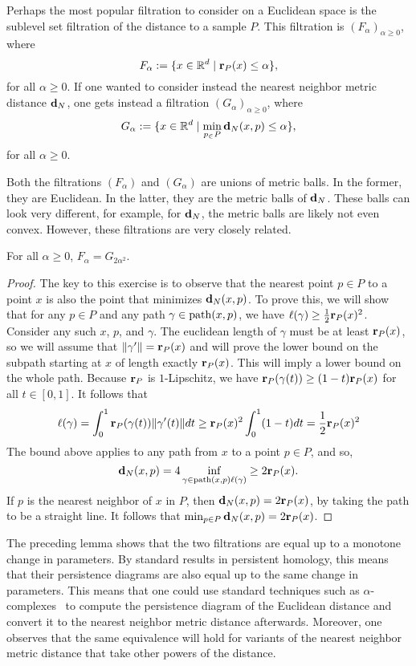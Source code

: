     Perhaps the most popular filtration to consider on a Euclidean space is the sublevel set filtration of the distance to a sample $P$.
    This filtration is $(F_\alpha)_{\alpha\ge 0}$, where
    \[
      F_\alpha := \{x\in \mathbb{R}^d \mid \mathbf{r}_P(x) \le \alpha\},
    \]
    for all $\alpha \ge 0$.
    If one wanted to consider instead the nearest neighbor metric distance $\mathbf{d}_N$, one gets instead a filtration $(G_\alpha)_{\alpha\ge 0}$, where
    \[
      G_\alpha := \{x\in \mathbb{R}^d \mid \min_{p_\in P} \mathbf{d}_N(x,p) \le \alpha\},
    \]
    for all $\alpha \ge 0$.

    Both the filtrations $(F_\alpha)$ and $(G_\alpha)$ are unions of metric balls.
    In the former, they are Euclidean.
    In the latter, they are the metric balls of $\mathbf{d}_N$.
    These balls can look very different, for example, for $\mathbf{d}_N$, the metric balls are likely not even convex.
    However, these filtrations are very closely related.
    \begin{lemma}
      For all $\alpha \ge 0$, $F_\alpha = G_{2\alpha^2}$.
    \end{lemma}
    \begin{proof}
      The key to this exercise is to observe that the nearest point $p \in P$ to a point $x$ is also the point that minimizes $\mathbf{d}_N(x,p)$.
      To prove this, we will show that for any $p\in P$ and any path $\gamma\in \mathrm{path}(x,p)$, we have $\ell(\gamma)\ge \frac{1}{2}\mathbf{r}_P(x)^2$.
      Consider any such $x$, $p$, and $\gamma$.
      The euclidean length of $\gamma$ must be at least $\mathbf{r}_P(x)$, so we will assume that $\|\gamma'\| = \mathbf{r}_P(x)$ and will prove the lower bound on the subpath starting at $x$ of length exactly $\mathbf{r}_P(x)$.
      This will imply a lower bound on the whole path.
      Because $\mathbf{r}_P$ is $1$-Lipschitz, we have $\mathbf{r}_P(\gamma(t))\ge (1-t)\mathbf{r}_P(x)$ for all $t\in [0,1]$.  It follows that
      \[
        \ell(\gamma) = \int_0^1 \mathbf{r}_P(\gamma(t))\|\gamma'(t)\|dt
          \ge \mathbf{r}_P(x)^2 \int_0^1 (1-t)dt
          =  \frac{1}{2}\mathbf{r}_P(x)^2
      \]
      The bound above applies to any path from $x$ to a point $p\in P$, and so,
      \[
        \mathbf{d}_N(x,p) = 4 \inf_{\gamma\in \mathrm{path}(x,p) \ell(\gamma)} \ge 2\mathbf{r}_P(x).
      \]
      If $p$ is the nearest neighbor of $x$ in $P$, then $\mathbf{d}_N(x,p) = 2\mathbf{r}_P(x)$, by taking the path to be a straight line.
      It follows that $\min_{p\in P}\mathbf{d}_N(x,p) = 2\mathbf{r}_P(x)$.
    \end{proof}

    The preceding lemma shows that the two filtrations are equal up to a monotone change in parameters.
    By standard results in persistent homology, this means that their persistence diagrams are also equal up to the same change in parameters.
    This means that one could use standard techniques such as $\alpha$-complexes~\cite{edelsbrunner02topological} to compute the persistence diagram of the Euclidean distance and convert it to the nearest neighbor metric distance afterwards.
    Moreover, one observes that the same equivalence will hold for variants of the nearest neighbor metric distance that take other powers of the distance.


